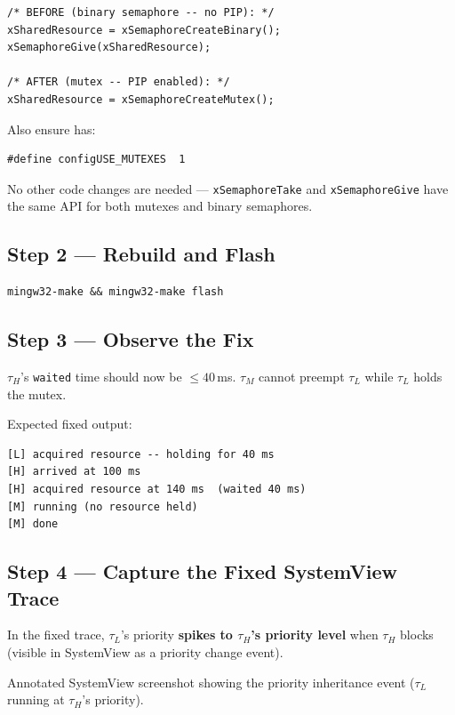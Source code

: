 \documentclass[11pt, a4paper]{article}
\begin{document}
\begin{lstlisting}[style=cstyle]
/* BEFORE (binary semaphore -- no PIP): */
xSharedResource = xSemaphoreCreateBinary();
xSemaphoreGive(xSharedResource);

/* AFTER (mutex -- PIP enabled): */
xSharedResource = xSemaphoreCreateMutex();
\end{lstlisting}

Also ensure  has:
\begin{lstlisting}[style=cstyle]
#define configUSE_MUTEXES  1
\end{lstlisting}

No other code changes are needed --- \texttt{xSemaphoreTake} and \texttt{xSemaphoreGive}
have the same API for both mutexes and binary semaphores.

\subsection{Step 2 --- Rebuild and Flash}

\begin{lstlisting}[style=bashstyle]
mingw32-make && mingw32-make flash
\end{lstlisting}

\subsection{Step 3 --- Observe the Fix}

$\tau_H$'s \texttt{waited} time should now be $\leq 40$\,ms. $\tau_M$ cannot preempt
$\tau_L$ while $\tau_L$ holds the mutex.

Expected fixed output:
\begin{lstlisting}[style=textstyle]
[L] acquired resource -- holding for 40 ms
[H] arrived at 100 ms
[H] acquired resource at 140 ms  (waited 40 ms)
[M] running (no resource held)
[M] done
\end{lstlisting}

\subsection{Step 4 --- Capture the Fixed SystemView Trace}

In the fixed trace, $\tau_L$'s priority \textbf{spikes to $\tau_H$'s priority level}
when $\tau_H$ blocks (visible in SystemView as a priority change event).

\begin{checkpointbox}[~C]
  Annotated SystemView screenshot showing the priority inheritance event
  ($\tau_L$ running at $\tau_H$'s priority).
\end{checkpointbox}
\end{document}
